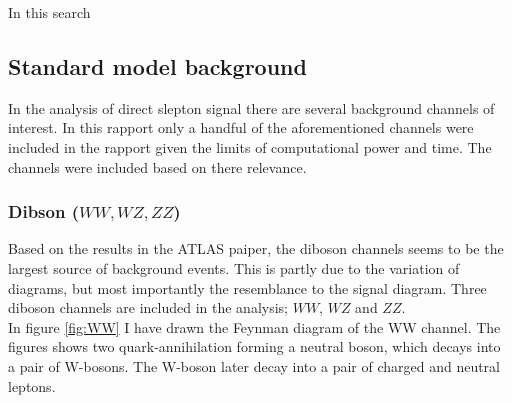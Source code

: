 \documentclass{article}
\begin{document}
In this search
\subsection{Standard model background}
In the analysis of direct slepton signal there are several background channels of interest. In this rapport only a handful of the aforementioned channels were included in the rapport given the limits of computational power and time. The channels were included based on there relevance. 
\subsubsection{Dibson ($WW,WZ,ZZ$)}
Based on the results in the ATLAS paiper, \cite{Aad_2020} the diboson channels seems to be the largest source of background events. This is partly due to the variation of diagrams, but most importantly the resemblance to the signal diagram. Three diboson channels are included in the analysis; $WW$, $WZ$ and $ZZ$.
\\
In figure \ref{fig:WW} I have drawn the Feynman diagram of the WW channel. The figures shows two quark-annihilation forming a neutral boson, which decays into a pair of W-bosons. The W-boson later decay into a pair of charged and neutral leptons. 
\end{document}
